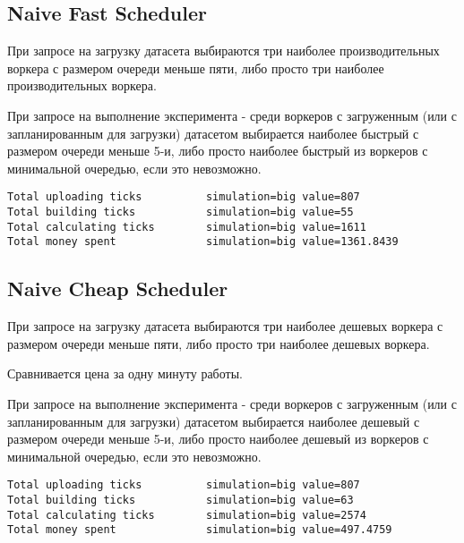 \subsection{Naive Fast Scheduler}

При запросе на загрузку датасета выбираются три наиболее производительных воркера с размером очереди меньше пяти, либо просто три наиболее производительных воркера.

При запросе на выполнение эксперимента - среди воркеров с загруженным (или с запланированным для загрузки) датасетом выбирается наиболее быстрый с размером очереди меньше 5-и, либо просто наиболее быстрый из воркеров с минимальной очередью, если это невозможно.

\begin{lstlisting}[caption=Naive Fast Scheduler]
Total uploading ticks          simulation=big value=807
Total building ticks           simulation=big value=55
Total calculating ticks        simulation=big value=1611
Total money spent              simulation=big value=1361.8439
\end{lstlisting}

\subsection{Naive Cheap Scheduler}

При запросе на загрузку датасета выбираются три наиболее дешевых воркера с размером очереди меньше пяти,
либо просто три наиболее дешевых воркера.

Сравнивается цена за одну минуту работы.

При запросе на выполнение эксперимента - среди воркеров с загруженным (или с запланированным для загрузки) датасетом выбирается наиболее дешевый с размером очереди меньше 5-и, либо просто наиболее дешевый из воркеров с минимальной очередью, если это невозможно.


\begin{lstlisting}[caption=Naive Cheap Scheduler]
Total uploading ticks          simulation=big value=807
Total building ticks           simulation=big value=63
Total calculating ticks        simulation=big value=2574
Total money spent              simulation=big value=497.4759
\end{lstlisting}